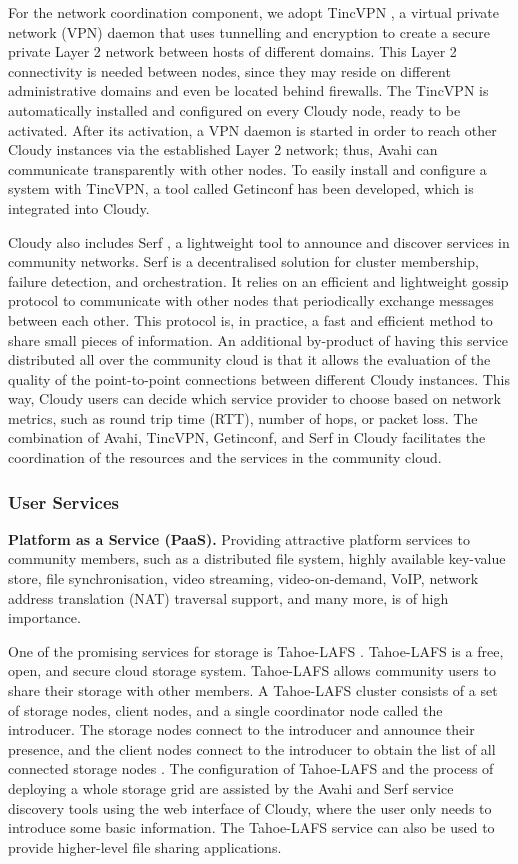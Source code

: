 For the network coordination component, we adopt TincVPN \cite{TincVPN}, a virtual private network (VPN) daemon that uses tunnelling and encryption to create a secure private Layer 2 network between hosts of different domains. This Layer 2 connectivity is needed between nodes, since they may reside on different administrative domains and even be located behind firewalls. The TincVPN is automatically installed and configured on every Cloudy node, ready to be activated. After its activation, a VPN daemon is started in order to reach other Cloudy instances via the established Layer 2 network; thus, Avahi can communicate transparently with other nodes. To easily install and configure a system with TincVPN, a tool called Getinconf \cite{Getinconf} has been developed, which is integrated into Cloudy. 

Cloudy also includes Serf \cite{Serf}, a lightweight tool to announce and discover services in community networks. Serf is a decentralised solution for cluster membership, failure detection, and orchestration. It relies on an efficient and lightweight gossip protocol to communicate with other nodes that periodically exchange messages between each other. This protocol is, in practice, a fast and efficient method to share small pieces of information. An additional by-product of having this service distributed all over the community cloud is that it allows the evaluation of the quality of the point-to-point connections between different Cloudy instances. This way, Cloudy users can decide which service provider to choose based on network metrics, such as round trip time (RTT), number of hops, or packet loss. The combination of Avahi, TincVPN, Getinconf, and Serf in Cloudy facilitates the coordination of the resources and the services in the community cloud.

\subsubsection{User Services}
   
\textbf{Platform as a Service (PaaS).}
Providing attractive platform services to community members, such as a distributed file system, highly available key-value store, file synchronisation, video streaming, video-on-demand, VoIP, network address translation (NAT) traversal support, and many more, is of high importance. 

One of the promising services for storage is Tahoe-LAFS \cite{Zooko}. 
Tahoe-LAFS is a free, open, and secure cloud storage system. 
Tahoe-LAFS allows community users to share their storage with other members. A Tahoe-LAFS cluster consists of a set of storage nodes, client nodes, and a single coordinator node called the introducer. The storage nodes connect to the introducer and announce their presence, and the client nodes connect to the introducer to obtain the list of all connected storage nodes \cite{bdcloud}. 
The configuration of Tahoe-LAFS and the process of deploying a whole storage grid are assisted by the Avahi and Serf service discovery tools using the web interface of Cloudy, where the user only needs to introduce some basic information. The Tahoe-LAFS service can also be used to provide higher-level file sharing applications.

